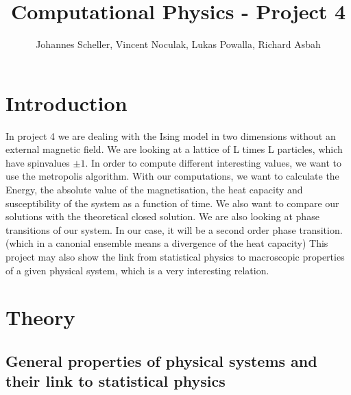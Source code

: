 \documentclass[10pt,a4paper]{article}
\author{Johannes Scheller, Vincent Noculak, Lukas Powalla, Richard Asbah}
\title{Computational Physics - Project 4}
\begin{document}
\maketitle
\newpage
\tableofcontents
\newpage

\section*{Introduction}
In project 4 we are dealing with the Ising model in two dimensions without an external magnetic field. We are looking at a lattice of L times L particles, which have spinvalues $\pm 1$. In order to compute different interesting values, we want to use the metropolis algorithm.  With our computations, we want to calculate the Energy, the absolute value of the magnetisation, the heat capacity and susceptibility of the system as a function of time. We also want to compare our solutions with the theoretical closed solution. 
We are also looking at phase transitions of our system. In our case, it will be a second order phase transition. (which in a canonial ensemble means a divergence of the heat capacity)
This project may also show the link from statistical physics to macroscopic properties of a given physical system, which is a very interesting relation. 
\section{Theory}

\subsection{General properties of physical systems and their link to statistical physics}
\end{document}
